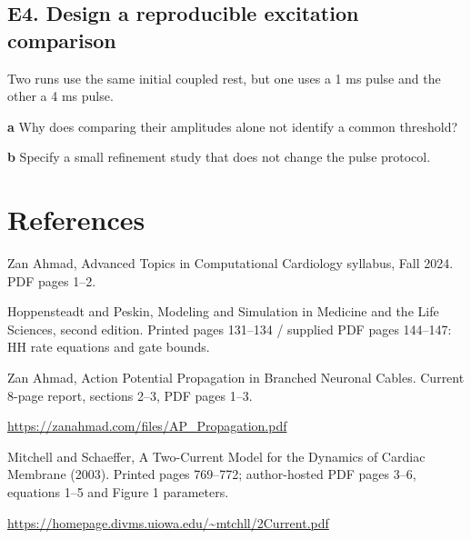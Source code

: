 \documentclass[11pt,letterpaper]{article}
\theoremstyle{definition}\newtheorem{definition}{Definition}\newtheorem{example}{Example}
\numberwithin{equation}{section}
\begin{document}
\par\noindent\begin{minipage}{\linewidth}
\subsection*{E4. Design a reproducible excitation comparison}
Two runs use the same initial coupled rest, but one uses a 1 ms pulse and the other a 4 ms pulse.

\textbf{a} Why does comparing their amplitudes alone not identify a common threshold?

\end{minipage}\par\medskip
\textbf{b} Specify a small refinement study that does not change the pulse protocol.

\section*{References}
\noindent\begin{minipage}{\linewidth}
Zan Ahmad, Advanced Topics in Computational Cardiology syllabus, Fall 2024. PDF pages 1--2.

\end{minipage}\par\medskip
\noindent\begin{minipage}{\linewidth}
Hoppensteadt and Peskin, Modeling and Simulation in Medicine and the Life Sciences, second edition. Printed pages 131--134 / supplied PDF pages 144--147: HH rate equations and gate bounds.

\end{minipage}\par\medskip
\noindent\begin{minipage}{\linewidth}
Zan Ahmad, Action Potential Propagation in Branched Neuronal Cables. Current 8-page report, sections 2--3, PDF pages 1--3.

\url{https://zanahmad.com/files/AP_Propagation.pdf}
\end{minipage}\par\medskip
\noindent\begin{minipage}{\linewidth}
Mitchell and Schaeffer, A Two-Current Model for the Dynamics of Cardiac Membrane (2003). Printed pages 769--772; author-hosted PDF pages 3--6, equations 1--5 and Figure 1 parameters.

\url{https://homepage.divms.uiowa.edu/~mtchll/2Current.pdf}
\end{minipage}\par\medskip
\end{document}
